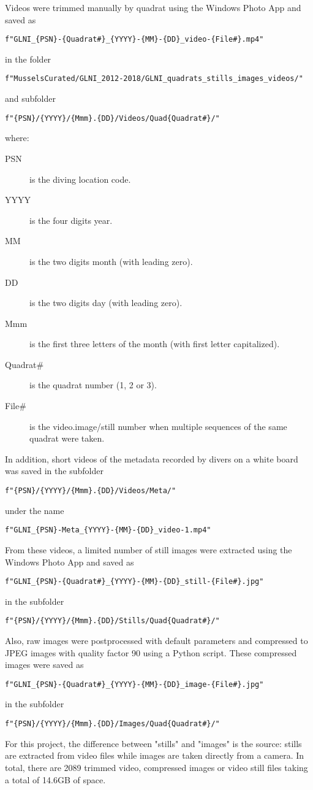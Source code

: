 \documentclass[11pt]{article} %
\begin{document}
Videos were trimmed manually by quadrat using the Windows Photo App and saved as
\begin{verbatim}
f"GLNI_{PSN}-{Quadrat#}_{YYYY}-{MM}-{DD}_video-{File#}.mp4"
\end{verbatim}
 in the folder
\begin{verbatim}
f"MusselsCurated/GLNI_2012-2018/GLNI_quadrats_stills_images_videos/"
\end{verbatim}
and subfolder
\begin{verbatim}
f"{PSN}/{YYYY}/{Mmm}.{DD}/Videos/Quad{Quadrat#}/"
\end{verbatim}
where:
\begin{description}
\item[PSN] is the diving location code.
\item[YYYY] is the four digits year.
\item[MM] is the two digits month (with leading zero).
\item[DD] is the two digits day (with leading zero).
\item[Mmm] is the first three letters of the month (with first letter capitalized).
\item[Quadrat\#] is the quadrat number (1, 2 or 3).
\item[File\#] is the video.image/still number when multiple sequences of the same quadrat were taken.
\end{description}
In addition, short videos of the metadata recorded by divers on a white board was saved in the subfolder
\begin{verbatim}
f"{PSN}/{YYYY}/{Mmm}.{DD}/Videos/Meta/"
\end{verbatim}
under the name
\begin{verbatim}
f"GLNI_{PSN}-Meta_{YYYY}-{MM}-{DD}_video-1.mp4"
\end{verbatim}
From these videos, a limited number of still images were extracted using the Windows Photo App and saved as
\begin{verbatim}
f"GLNI_{PSN}-{Quadrat#}_{YYYY}-{MM}-{DD}_still-{File#}.jpg"
\end{verbatim}
in the subfolder
\begin{verbatim}
f"{PSN}/{YYYY}/{Mmm}.{DD}/Stills/Quad{Quadrat#}/"
\end{verbatim}
Also, raw images were postprocessed with default parameters and compressed to JPEG images with quality factor 90 using a Python script. These compressed images were saved as
\begin{verbatim}
f"GLNI_{PSN}-{Quadrat#}_{YYYY}-{MM}-{DD}_image-{File#}.jpg"
\end{verbatim}
in the subfolder
\begin{verbatim}
f"{PSN}/{YYYY}/{Mmm}.{DD}/Images/Quad{Quadrat#}/"
\end{verbatim}
For this project, the difference between "stills" and "images" is the source: stills are extracted from video files while images are taken directly from a camera. In total, there are 2089 trimmed video, compressed images or video still files taking a total of 14.6GB of space.
\end{document}
